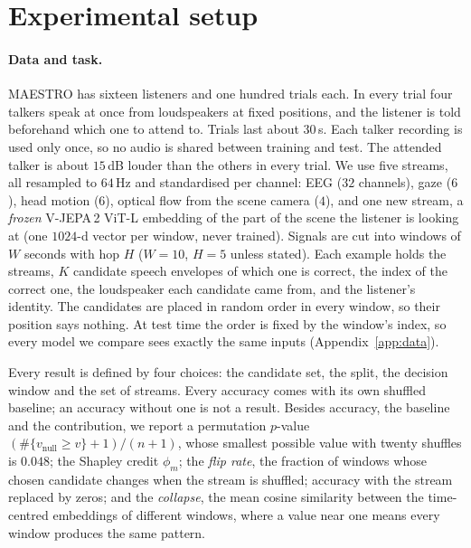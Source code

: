 \section{Experimental setup}
\label{sec:setup}

\paragraph{Data and task.}
MAESTRO \citep{maestro2026} has sixteen listeners and one hundred trials each.
In every trial four talkers speak at once from loudspeakers at fixed positions,
and the listener is told beforehand which one to attend to. Trials last about
$30$\,s. Each talker recording is used only once, so no audio is shared between
training and test. The attended talker is about $15$\,dB louder than the others
in every trial. We use five streams, all resampled to $64$\,Hz and standardised
per channel: EEG ($32$ channels), gaze ($6$), head motion ($6$), optical flow
from the scene camera ($4$), and one new stream, a \emph{frozen} V-JEPA\,2 ViT-L
embedding \citep{assran2025vjepa2} of the part of the scene the listener is
looking at (one $1024$-d vector per window, never trained). Signals are cut into
windows of $W$ seconds with hop $H$ ($W\!=\!10$, $H\!=\!5$ unless stated). Each
example holds the streams, $K$ candidate speech envelopes of which one is
correct, the index of the correct one, the loudspeaker each candidate came from,
and the listener's identity. The candidates are placed in random order in every
window, so their position says nothing. At test time the order is fixed by the
window's index, so every model we compare sees exactly the same inputs
(Appendix~\ref{app:data}).

Every result is defined by four choices: the candidate set, the split, the
decision window and the set of streams. Every accuracy comes with its own
shuffled baseline; an accuracy without one is not a result. Besides accuracy,
the baseline and the contribution, we report a permutation $p$-value
$(\#\{v_{\text{null}}\!\ge\!v\}+1)/(n+1)$, whose smallest possible value with
twenty shuffles is $0.048$; the Shapley credit $\phi_m$; the \emph{flip rate},
the fraction of windows whose chosen candidate changes when the stream is
shuffled; accuracy with the stream replaced by zeros; and the \emph{collapse},
the mean cosine similarity between the time-centred embeddings of different
windows, where a value near one means every window produces the same pattern.

